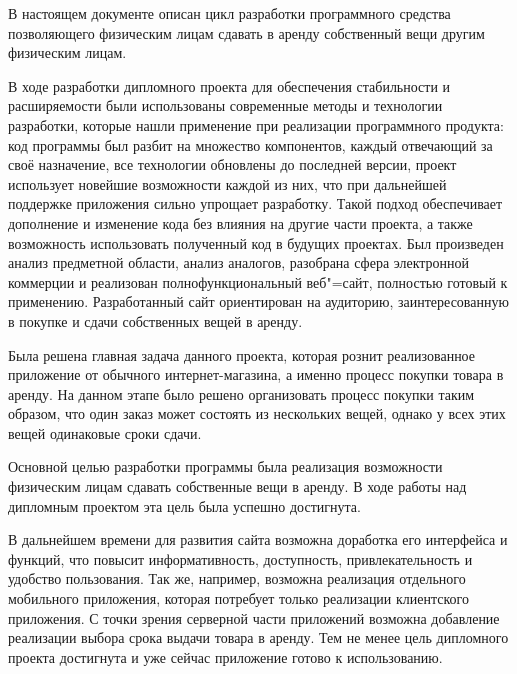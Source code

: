 
В настоящем документе описан цикл разработки программного средства позволяющего физическим лицам сдавать в аренду собственный вещи другим физическим лицам.

В ходе разработки дипломного проекта для обеспечения стабильности и расширяемости были использованы современные методы и технологии разработки, которые нашли
применение при реализации программного продукта: код программы был разбит на множество компонентов, каждый отвечающий за своё назначение, все технологии обновлены до последней версии, проект использует новейшие
возможности каждой из них, что при дальнейшей поддержке приложения сильно упрощает разработку.
Такой подход обеспечивает дополнение и изменение кода без влияния на другие части проекта, а также возможность использовать полученный код в будущих проектах.
Был произведен анализ предметной области, анализ аналогов, разобрана сфера электронной коммерции и реализован полнофункциональный веб"=сайт, полностью готовый к применению.
Разработанный сайт ориентирован на аудиторию, заинтересованную в покупке и сдачи собственных вещей в аренду.

Была решена главная задача данного проекта, которая рознит реализованное приложение от обычного интернет-магазина, а именно процесс покупки товара в аренду.
На данном этапе было решено организовать процесс покупки таким образом, что один заказ может состоять из нескольких вещей, однако у всех этих вещей одинаковые сроки сдачи.


Основной целью разработки программы была реализация возможности физическим лицам сдавать собственные вещи в аренду.
В ходе работы над дипломным проектом эта цель была успешно достигнута.

В дальнейшем времени для развития сайта возможна доработка его интерфейса и функций, что повысит информативность, доступность, привлекательность и удобство пользования.
Так же, например, возможна реализация отдельного мобильного приложения, которая потребует только реализации клиентского приложения.
С точки зрения серверной части приложений возможна добавление реализации выбора срока выдачи товара в аренду.
Тем не менее цель дипломного проекта достигнута и уже сейчас приложение готово к использованию.
